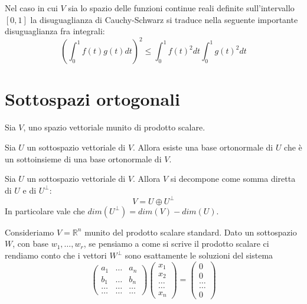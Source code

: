 \begin{example}
	Nel caso in cui $V$ sia lo spazio delle funzioni continue reali definite
	sull'intervallo $[0, 1]$ la disuguaglianza di Cauchy-Schwarz si traduce
	nella seguente importante disuguaglianza fra integrali:
	\begin{equation*}
		\left( \int_0^1 f(t)g(t)dt \right)^2 \leq
		\int_0^1 f(t)^2 dt \int_0^1 g(t)^2 dt
	\end{equation*}
\end{example}

\section{Sottospazi ortogonali}
Sia $V$, uno spazio vettoriale munito di prodotto scalare.

\begin{proposition}
	Sia $U$ un sottospazio vettoriale di $V$. Allora esiste una base
	ortonormale di $U$ che \`e un sottoinsieme di una base ortonormale di $V$.
\end{proposition}

\begin{theorem}
	Sia $U$ un sottospazio vettoriale di $V$. Allora $V$ si decompone come
	somma diretta di $U$ e di $U^\perp$:
	\begin{equation*}
		V = U \oplus U^\perp
	\end{equation*}
	In particolare vale che $dim(U^\perp) = dim(V) - dim(U)$.
\end{theorem}

\begin{observation}
	Consideriamo $V = \mathbb{R}^n$ munito del prodotto scalare standard. Dato
	un sottospazio $W$, con base $w_1, \dots, w_r$, se pensiamo a come si
	scrive il prodotto scalare ci rendiamo conto che i vettori $W^\perp$ sono
	esattamente le soluzioni del sistema
	\begin{equation*}
		\begin{pmatrix}
			a_1   & \dots & a_n   \\
			b_1   & \dots & b_n   \\
			\dots & \dots & \dots \\
			\dots & \dots & \dots
		\end{pmatrix}
		\begin{pmatrix}
			x_1 \\ x_2 \\ \dots \\ \dots \\ x_n
		\end{pmatrix} =
		\begin{pmatrix}
			0 \\ 0 \\ \dots \\ \dots \\ 0
		\end{pmatrix}
	\end{equation*}
\end{observation}